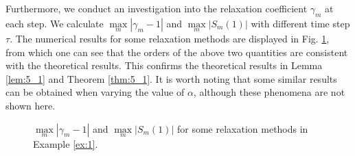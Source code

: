\documentclass[preprint,compress,3p,10pt,fleqn]{elsarticle}
\numberwithin{equation}{section}
\begin{document}
Furthermore, we conduct an investigation into the relaxation coefficient $\gamma_m$ at each step.
We calculate $\max\limits _m\left|\gamma_m-1\right|$ and $\max\limits _m\left|S_m(1)\right|$ with different time step $\tau$.
The numerical results for some relaxation methods are displayed in Fig. \ref{fig:1}, from which one can see that the orders of the above two quantities are consistent with the theoretical results. This confirms the theoretical results in Lemma \ref{lem:5_1} and Theorem \ref{thm:5_1}.  It is worth noting that
some similar results can be obtained when varying the value of $\alpha$, although these phenomena are not shown here.
\begin{figure}[H]
\begin{center}
\caption{$\max\limits_m\left|\gamma_m-1\right|$ and $\max\limits_m\left|S_m(1)\right|$ for some relaxation methods in Example \ref{ex:1}.}
\label{fig:1}
\end{center}
\end{figure}
	
\end{document}
